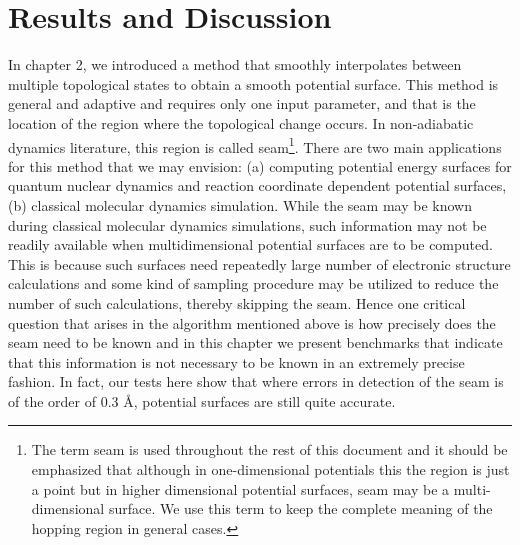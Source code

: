 \chapter{Results and Discussion}
{\label {chapter3}}
In chapter 2, we introduced a method that smoothly interpolates between multiple topological
states to obtain a smooth potential surface. This method is general and adaptive and requires
only one input parameter, and that is the location of the region where the topological change
occurs. In non-adiabatic dynamics literature, this region is called seam\footnote{The term
seam is used throughout the rest of this document and it should be emphasized that although
in one-dimensional potentials this the region is just a point but in higher dimensional
potential surfaces, seam may be a multi-dimensional surface. We use this term to keep the
complete meaning of the hopping region in general cases.}. There are two main
applications for this method that we may envision: (a) computing
potential energy surfaces for quantum nuclear dynamics and reaction coordinate dependent
potential surfaces,(b) classical molecular dynamics simulation. While the seam may be known
during classical molecular dynamics simulations, such information may not be readily
available when multidimensional potential surfaces are to be computed. This is because such
surfaces need repeatedly large number of electronic structure calculations and some kind of
sampling procedure may be utilized to reduce the number of such calculations, thereby skipping
the seam. Hence one critical question that arises in the algorithm mentioned above is how
precisely does the seam need to be known and in this chapter we present benchmarks
that indicate that this information is not necessary to be known in an extremely precise
fashion. In fact, our tests here show that where errors in detection of the seam
is of the order of 0.3 \AA, potential surfaces are still quite accurate.


